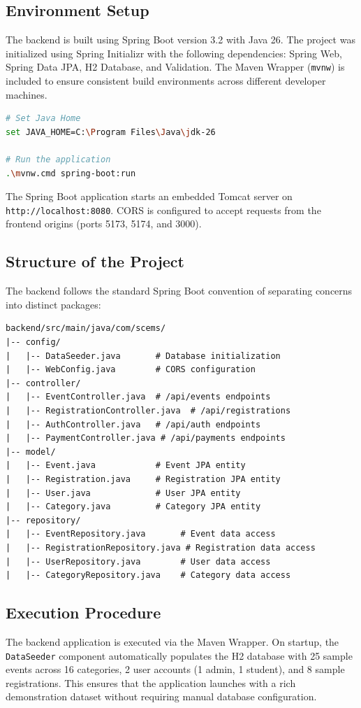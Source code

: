 \subsection{Environment Setup}
The backend is built using Spring Boot version 3.2 with Java 26. The project was initialized using Spring Initializr with the following dependencies: Spring Web, Spring Data JPA, H2 Database, and Validation. The Maven Wrapper (\texttt{mvnw}) is included to ensure consistent build environments across different developer machines.

\begin{lstlisting}[language=bash, caption={Backend Execution}]
# Set Java Home
set JAVA_HOME=C:\Program Files\Java\jdk-26

# Run the application
.\mvnw.cmd spring-boot:run
\end{lstlisting}

The Spring Boot application starts an embedded Tomcat server on \texttt{http://localhost:8080}. CORS is configured to accept requests from the frontend origins (ports 5173, 5174, and 3000).

\subsection{Structure of the Project}
The backend follows the standard Spring Boot convention of separating concerns into distinct packages:

\begin{lstlisting}[caption={Backend Directory Structure}]
backend/src/main/java/com/scems/
|-- config/
|   |-- DataSeeder.java       # Database initialization
|   |-- WebConfig.java        # CORS configuration
|-- controller/
|   |-- EventController.java  # /api/events endpoints
|   |-- RegistrationController.java  # /api/registrations
|   |-- AuthController.java   # /api/auth endpoints
|   |-- PaymentController.java # /api/payments endpoints
|-- model/
|   |-- Event.java            # Event JPA entity
|   |-- Registration.java     # Registration JPA entity
|   |-- User.java             # User JPA entity
|   |-- Category.java         # Category JPA entity
|-- repository/
|   |-- EventRepository.java       # Event data access
|   |-- RegistrationRepository.java # Registration data access
|   |-- UserRepository.java        # User data access
|   |-- CategoryRepository.java    # Category data access
\end{lstlisting}

\subsection{Execution Procedure}
The backend application is executed via the Maven Wrapper. On startup, the \texttt{DataSeeder} component automatically populates the H2 database with 25 sample events across 16 categories, 2 user accounts (1 admin, 1 student), and 8 sample registrations. This ensures that the application launches with a rich demonstration dataset without requiring manual database configuration.

